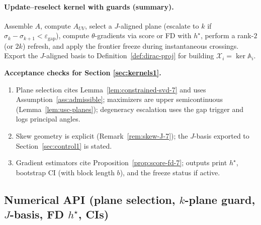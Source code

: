 \paragraph{Update--reselect kernel with guards (summary).}
Assemble $A$, compute $A_{UV}$, select a $J$-aligned plane (escalate to $k$ if $\sigma_k-\sigma_{k+1}<\varepsilon_{\mathrm{gap}}$), compute $\theta$-gradients via score or FD with $h^\star$, perform a rank-$2$ (or $2k$) refresh, and apply the frontier freeze during instantaneous crossings. Export the $J$-aligned basis to Definition~\ref{def:dirac-proj} for building $\mathcal X_i=\ker\mathbb A_i$.

\begin{mdframed}
\textbf{Acceptance checks for Section \ref{sec:kernels1}.}
\begin{enumerate}[leftmargin=*]
\item Plane selection cites Lemma~\ref{lem:constrained-svd-7} and uses Assumption~\ref{ass:admissible}; maximizers are upper semicontinuous (Lemma~\ref{lem:usc-planes}); degeneracy escalation uses the gap trigger and logs principal angles.
\item Skew geometry is explicit (Remark~\ref{rem:skew-J-7}); the $J$-basis exported to Section~\ref{sec:control1} is stated.
\item Gradient estimators cite Proposition~\ref{prop:score-fd-7}; outputs print $h^\star$, bootstrap CI (with block length $b$), and the freeze status if active.
\end{enumerate}
\end{mdframed}

\subsection*{Numerical API (plane selection, $k$-plane guard, $J$-basis, FD $h^\star$, CIs)}

